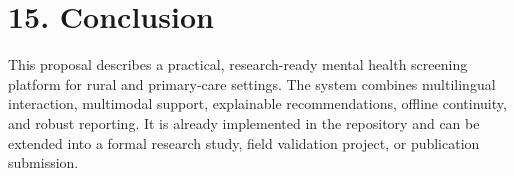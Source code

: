 \documentclass[11pt]{article}
\begin{document}
\section{15. Conclusion}
This proposal describes a practical, research-ready mental health screening platform for rural and primary-care settings. The system combines multilingual interaction, multimodal support, explainable recommendations, offline continuity, and robust reporting. It is already implemented in the repository and can be extended into a formal research study, field validation project, or publication submission.



\end{document}
